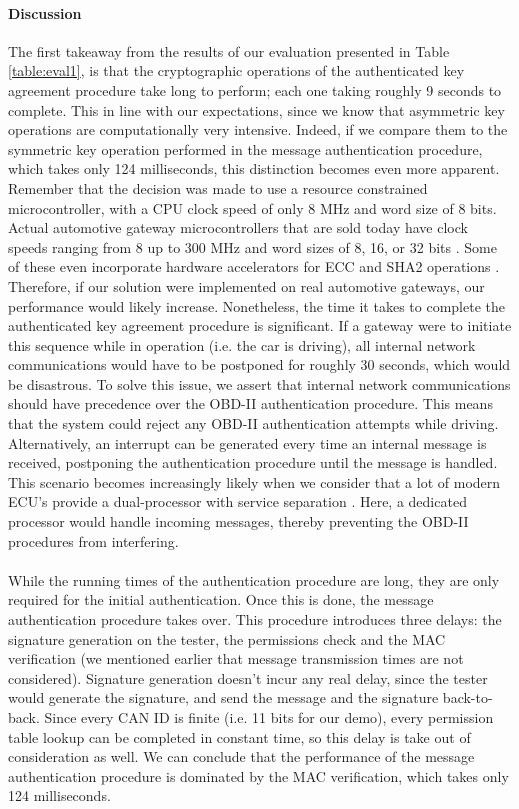 \paragraph{Discussion} The first takeaway from the results of our evaluation presented in Table \ref{table:eval1}, is that the cryptographic operations of the authenticated key agreement procedure take long to perform; each one taking roughly 9 seconds to complete. This in line with our expectations, since we know that asymmetric key operations are computationally very intensive. Indeed, if we compare them to the symmetric key operation performed in the message authentication procedure, which takes only 124 milliseconds, this distinction becomes even more apparent. Remember that the decision was made to use a resource constrained microcontroller, with a CPU clock speed of only 8 MHz and word size of 8 bits. Actual automotive gateway microcontrollers that are sold today have clock speeds ranging from 8 up to 300 MHz and word sizes of 8, 16, or 32 bits \cite{GatewayInfineon,GatewayAtmel,GatewayST}. Some of these even incorporate hardware accelerators for ECC and SHA2 operations \cite{GatewayInfineon}. Therefore, if our solution were implemented on real automotive gateways, our performance would likely increase. Nonetheless, the time it takes to complete the authenticated key agreement procedure is significant. If a gateway were to initiate this sequence while in operation (i.e. the car is driving), all internal network communications would have to be postponed for roughly 30 seconds, which would be disastrous. To solve this issue, we assert that internal network communications should have precedence over the OBD-II authentication procedure. This means that the system could reject any OBD-II authentication attempts while driving. Alternatively, an interrupt can be generated every time an internal message is received, postponing the authentication procedure until the message is handled. This scenario becomes increasingly likely when we consider that a lot of modern ECU's provide a dual-processor with service separation \cite{GatewayPerformance}. Here, a dedicated processor would handle incoming messages, thereby preventing the OBD-II procedures from interfering. \\ \\ While the running times of the authentication procedure are long, they are only required for the initial authentication. Once this is done, the message authentication procedure takes over. This procedure introduces three delays: the signature generation on the tester, the permissions check and the MAC verification (we mentioned earlier that message transmission times are not considered). Signature generation doesn't incur any real delay, since the tester would generate the signature, and send the message and the signature back-to-back. Since every CAN ID is finite (i.e. 11 bits for our demo), every permission table lookup can be completed in constant time, so this delay is take out of consideration as well. We can conclude that the performance of the message authentication procedure is dominated by the MAC verification, which takes only 124 milliseconds. 